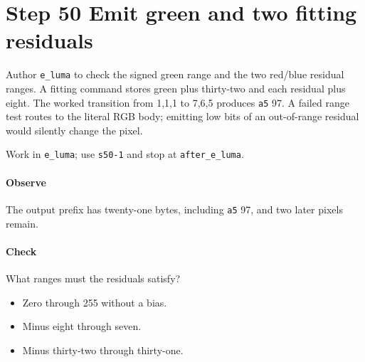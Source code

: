 \section{Step 50 Emit green and two fitting residuals}\label{qoi-s50}
Author \texttt{e\_luma} to check the signed green range and the two red/blue residual ranges. A fitting command stores green plus thirty-two and each residual plus eight. The worked transition from 1,1,1 to 7,6,5 produces \texttt{a5} 97. A failed range test routes to the literal RGB body; emitting low bits of an out-of-range residual would silently change the pixel.

Work in \texttt{e\_luma}; use \texttt{s50-1} and stop at \texttt{after\_e\_luma}.

\paragraph{Observe} The output prefix has twenty-one bytes, including \texttt{a5} 97, and two later pixels remain.

\paragraph{Check} What ranges must the residuals satisfy?
\begin{itemize}
  \item[A.] Zero through 255 without a bias.
  \item[B.] Minus eight through seven.
  \item[C.] Minus thirty-two through thirty-one.
\end{itemize}
